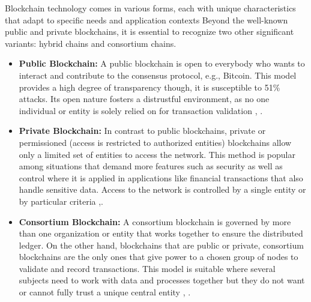 Blockchain technology comes in various forms, each with unique characteristics that adapt to specific needs and application contexts Beyond the well-known public and 
private blockchains, it is essential to recognize two other significant variants: hybrid chains and consortium chains.

\newpage

\begin{itemize}
  \item \textbf{Public Blockchain:} A public blockchain is open to everybody who wants to interact and contribute to the consensus protocol, e.g., Bitcoin. 
  This model provides a high degree of transparency though, it is susceptible to 51\% attacks. Its open nature fosters a distrustful environment, as no one individual or 
  entity is solely relied on for transaction validation \cite{9596538}, \cite{ibm_blockchain}.
  \item \textbf{Private Blockchain:} In contrast to public blockchains, private or permissioned (access is restricted to authorized entities) blockchains 
  allow only a limited set of entities to access the network. This method is popular among situations that demand more features such as security as well as control 
  where it is applied in applications like financial transactions that also handle sensitive data. Access to the network is controlled by a single entity or by 
  particular criteria \cite{9596538},\cite{9036241}.
 \item \textbf{Consortium Blockchain:} A consortium blockchain is governed by more than one organization or entity that works together to ensure the distributed ledger. 
  On the other hand, blockchains that are public or private, consortium blockchains are the only ones that give power to a chosen group of nodes to validate and record 
  transactions. This model is suitable where several subjects need to work with data and processes together but they do not want or cannot fully trust a unique 
  central entity \cite{ibm_blockchain}, \cite{9752154}.
\end{itemize}

